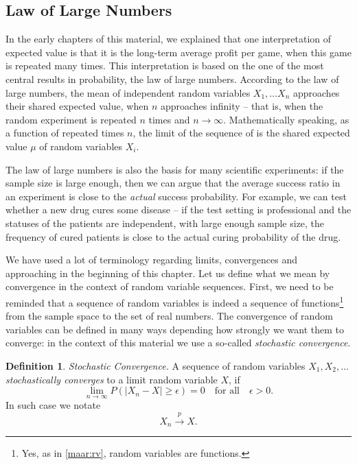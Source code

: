 \documentclass[12pt,a4paper,leqno]{report}
\theoremstyle{plain}
\theoremstyle{definition}
\newtheorem{maar}[equation]{Definition}
\begin{document}
\subsection{Law of Large Numbers}\label{sll}

In the early chapters of this material, we explained that one interpretation of expected value is that it is the long-term average profit per game, when this game is repeated many times. This interpretation is based on the one of the most central results in probability, the law of large numbers. According to the law of large numbers, the mean of independent random variables $X_1, \dots X_n$ approaches their shared expected value, when $n$ approaches infinity -- that is, when the random experiment is repeated $n$ times and $n \rightarrow \infty$. Mathematically speaking, as a function of repeated times $n$, the limit of the sequence of is the shared expected value $\mu$ of random variables $X_i$. 

The law of large numbers is also the basis for many scientific experiments: if the sample size is large enough, then we can argue that the average success ratio in an experiment is close to the \emph{actual} success probability. For example, we can test whether a new drug cures some disease -- if the test setting is professional and the statuses of the patients are independent, with large enough sample size, the frequency of cured patients is close to the actual curing probability of the drug.

\bigskip

We have used a lot of terminology regarding limits, convergences and approaching in the beginning of this chapter. Let us define what we mean by convergence in the context of random variable sequences. First, we need to be reminded that a sequence of random variables is indeed a sequence of functions\footnote{Yes, as in \ref{maar:rv}, random variables are functions.} from the sample space to the set of real numbers. The convergence of random variables can be defined in many ways depending how strongly we want them to converge: in the context of this material we use a so-called \emph{stochastic convergence}.

\begin{maar}
\emph{Stochastic Convergence.} A sequence of random variables $X_1, X_2, \dots$ \emph{stochastically converges} to a limit random variable $X$, if
\[
\lim_{n\rightarrow \infty}P(|X_n - X| \geq \epsilon) = 0 \quad \text{for all} \quad \epsilon > 0.
\]
In such case we notate
\[
X_n \overset{p}{\rightarrow} X.
\]
\end{maar}
\end{document}
